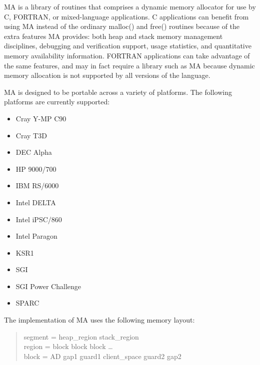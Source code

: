 
\setlength{\topmargin}{0in}
\setlength{\headheight}{0in}
\setlength{\headsep}{0in}
\setlength{\topskip}{0in}
\setlength{\textheight}{8.5in}
\setlength{\footheight}{10pt}
\setlength{\footskip}{0.5in}

\setlength{\textwidth}{6.5in}
\setlength{\oddsidemargin}{0in}
\setlength{\evensidemargin}{0in}
\setlength{\marginparwidth}{0in}
\setlength{\parindent}{0in}



MA is a library of routines that comprises a dynamic memory allocator
for use by C, FORTRAN, or mixed-language applications.  C applications
can benefit from using MA instead of the ordinary malloc() and free()
routines because of the extra features MA provides:  both heap and
stack memory management disciplines, debugging and verification
support, usage statistics, and quantitative memory availability
information.  FORTRAN applications can take advantage of the same
features, and may in fact require a library such as MA because dynamic
memory allocation is not supported by all versions of the language.

MA is designed to be portable across a variety of platforms.
The following platforms are currently supported:

\begin{itemize}
\item Cray Y-MP C90
\item Cray T3D
\item DEC Alpha
\item HP 9000/700
\item IBM RS/6000
\item Intel DELTA
\item Intel iPSC/860
\item Intel Paragon
\item KSR1
\item SGI
\item SGI Power Challenge
\item SPARC
\end{itemize}

The implementation of MA uses the following memory layout:

\begin{quote}
segment = heap\_region stack\_region \\
region = block block block \ldots \\
block = AD gap1 guard1 client\_space guard2 gap2
\end{quote}

